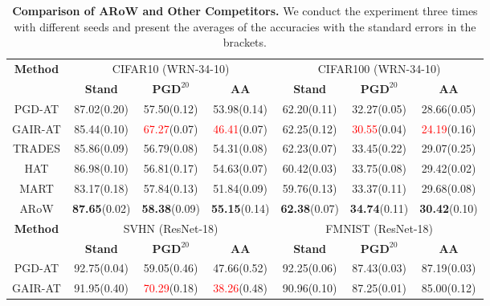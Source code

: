 \documentclass[nohyperref]{article}
\theoremstyle{plain}
\theoremstyle{definition}
\theoremstyle{remark}
\begin{document}
\begin{table}[ht]
    \footnotesize
    \caption{\textbf{Comparison of ARoW and Other Competitors.} We conduct the experiment three times with different seeds and present the averages of the accuracies with the standard errors in the brackets.}
    \centering
    \begin{tabular}{c|ccc|ccc}
    \toprule
     \multirow{2}{*}{\textbf{Method}} &
        \multicolumn{3}{c|}{CIFAR10 (WRN-34-10)} &
        \multicolumn{3}{c}{CIFAR100 (WRN-34-10)} \\
    \cline{2-7}    
     & \textbf{Stand}  & $\textbf{PGD}^{20}$ & \textbf{AA} & \textbf{Stand}  & $\textbf{PGD}^{20}$ & \textbf{AA} \\
     \hline
    PGD-AT                        & 87.02(0.20) & 57.50(0.12) & 53.98(0.14) & 62.20(0.11) & 32.27(0.05) & 28.66(0.05) \\
    GAIR-AT                         & 85.44(0.10) & \textcolor{red}{67.27}(0.07) & \textcolor{red}{46.41}(0.07) & 62.25(0.12) & \textcolor{red}{30.55}(0.04) & \textcolor{red}{24.19}(0.16) \\
    TRADES                      & 85.86(0.09) & 56.79(0.08) & 54.31(0.08) & 
    62.23(0.07) & 33.45(0.22) & 29.07(0.25) \\
    HAT                         & 86.98(0.10) & 56.81(0.17) & 54.63(0.07) &  60.42(0.03) & 33.75(0.08) & 29.42(0.02) \\
    MART                        & 83.17(0.18) & 57.84(0.13) & 51.84(0.09) & 59.76(0.13) & 33.37(0.11) & 29.68(0.08) \\
    ARoW                     & \textbf{87.65}(0.02) & \textbf{58.38}(0.09) & \textbf{55.15}(0.14) &   \textbf{62.38}(0.07) & \textbf{34.74}(0.11) & \textbf{30.42}(0.10) \\
    \hline
    \hline
     \multirow{2}{*}{\textbf{Method}} &
        \multicolumn{3}{c|}{SVHN (ResNet-18)} &
        \multicolumn{3}{c}{FMNIST (ResNet-18)} \\
    \cline{2-7}
     & \textbf{Stand}  & $\textbf{PGD}^{20}$ & \textbf{AA} & \textbf{Stand}  & $\textbf{PGD}^{20}$ & \textbf{AA} \\
     \hline
    PGD-AT                       & 92.75(0.04) & 59.05(0.46) & 47.66(0.52) &  92.25(0.06) & 87.43(0.03) & 87.19(0.03) \\
    GAIR-AT                         & 91.95(0.40) & \textcolor{red}{70.29}(0.18) & \textcolor{red}{38.26}(0.48) &  90.96(0.10) & 87.25(0.01) & 85.00(0.12) \\ 

\end{tabular}
\end{table}
\end{document}
